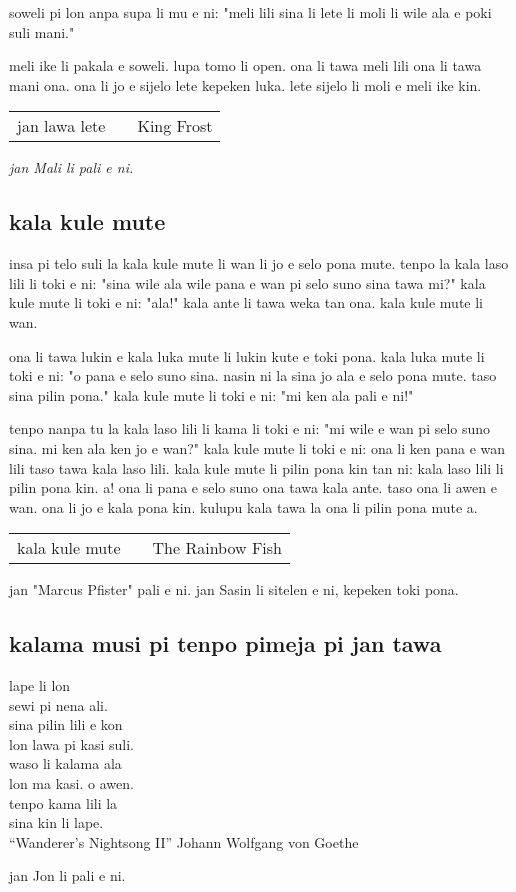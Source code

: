 soweli pi lon anpa supa li mu e ni:
"meli lili sina li lete li moli li wile ala e poki suli mani."

meli ike li pakala e soweli.
lupa tomo li open.
ona li tawa meli lili ona li tawa mani ona.
ona li jo e sijelo lete kepeken luka.
lete sijelo li moli e meli ike kin.

\begin{supertabular}{p{5,5cm}|ll}
    jan lawa lete &  & King Frost \\
\end{supertabular}

\textit{jan Mali li pali e ni. \cite{www:astrodonunt:01}}

\subsection{kala kule mute}
insa pi telo suli la kala kule mute li wan li jo e selo pona mute.
tenpo la kala laso lili li toki e ni: "sina wile ala wile pana e wan pi selo suno sina tawa mi?"
kala kule mute li toki e ni: "ala!"
kala ante li tawa weka tan ona. kala kule mute li wan.

ona li tawa lukin e kala luka mute li lukin kute e toki pona.
kala luka mute li toki e ni: "o pana e selo suno sina. nasin ni la sina jo ala e selo pona mute. taso sina pilin pona."
kala kule mute li toki e ni: "mi ken ala pali e ni!"

tenpo nanpa tu la kala laso lili li kama li toki e ni: "mi wile e wan pi selo suno sina. mi ken ala ken jo e wan?"
kala kule mute li toki e ni: ona li ken pana e wan lili taso tawa kala laso lili.
kala kule mute li pilin pona kin tan ni: kala laso lili li pilin pona kin. a!
ona li pana e selo suno ona tawa kala ante. taso ona li awen e wan.
ona li jo e kala pona kin.
kulupu kala tawa la ona li pilin pona mute a.

\begin{supertabular}{p{5,5cm}|ll}
    kala kule mute &  & The Rainbow Fish \\
\end{supertabular}

jan "Marcus Pfister" pali e ni. jan Sasin li sitelen e ni, kepeken toki pona.

\newpage

\subsection{kalama musi pi tenpo pimeja pi jan tawa}
lape li lon \\
sewi pi nena ali. \\
sina pilin lili e kon \\
lon lawa pi kasi suli. \\
waso li kalama ala \\
lon ma kasi. o awen. \\
tenpo kama lili la \\
sina kin li lape. \\

``Wanderer's Nightsong II'' Johann Wolfgang von Goethe

jan Jon li pali e ni. \cite{www:janJon:01}
